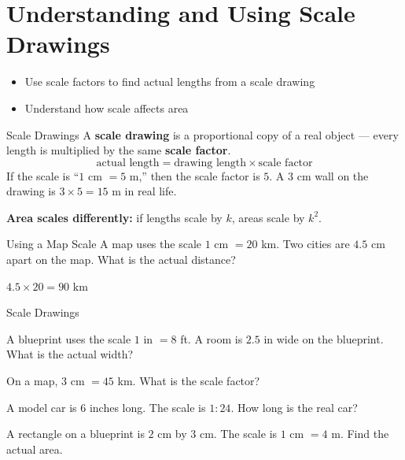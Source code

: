 \section{Understanding and Using Scale Drawings}

\begin{learningGoals}
\begin{itemize}
    \item Use scale factors to find actual lengths from a scale drawing
    \item Understand how scale affects area
\end{itemize}
\end{learningGoals}

\begin{conceptBox}{Scale Drawings}
A \textbf{scale drawing} is a proportional copy of a real object — every length is multiplied by the same \textbf{scale factor}.
$$\text{actual length} = \text{drawing length} \times \text{scale factor}$$
If the scale is ``$1$ cm $= 5$ m,'' then the scale factor is $5$. A $3$ cm wall on the drawing is $3 \times 5 = 15$ m in real life.

\textbf{Area scales differently:} if lengths scale by $k$, areas scale by $k^2$.
\end{conceptBox}

\begin{workedExample}{Using a Map Scale}
A map uses the scale $1$ cm $= 20$ km. Two cities are $4.5$ cm apart on the map. What is the actual distance?

$4.5 \times 20 = 90$ km
\end{workedExample}


\begin{practiceBox}{Scale Drawings}
\resetProblems

\prob A blueprint uses the scale $1$ in $= 8$ ft. A room is $2.5$ in wide on the blueprint. What is the actual width?

\prob On a map, $3$ cm $= 45$ km. What is the scale factor?

\prob A model car is $6$ inches long. The scale is $1:24$. How long is the real car?

\prob A rectangle on a blueprint is $2$ cm by $3$ cm. The scale is $1$ cm $= 4$ m. Find the actual area.


\end{practiceBox}

